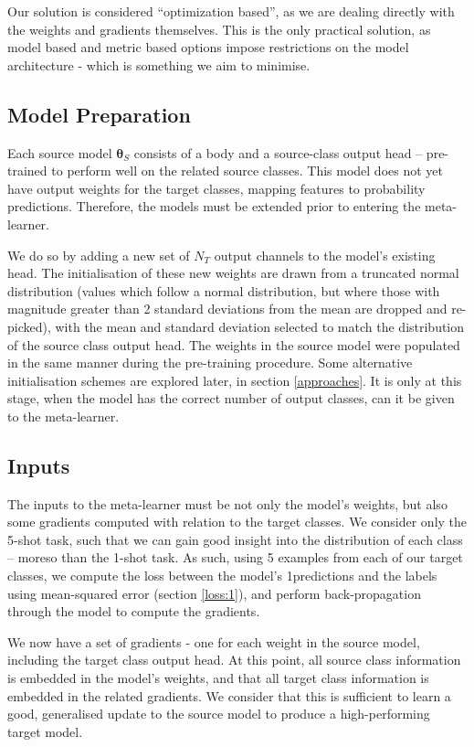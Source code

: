 \documentclass{report}
\begin{document}
Our solution is considered ``optimization based'', as we are dealing directly with the weights and gradients themselves. This is the only practical solution, as model based and metric based options impose restrictions on the model architecture - which is something we aim to minimise. \par




\subsection{Model Preparation}
Each source model $\bm{\theta}_S$ consists of a body and a source-class output head -- pre-trained to perform well on the related source classes. This model does not yet have output weights for the target classes, mapping features to probability predictions. Therefore, the models must be extended prior to entering the meta-learner. \par
We do so by adding a new set of $N_T$ output channels to the model's existing head. The initialisation of these new weights are drawn from a truncated normal distribution (values which follow a normal distribution, but where those with magnitude greater than 2 standard deviations from the mean are dropped and re-picked), with the mean and standard deviation selected to match the distribution of the source class output head. The weights in the source model were populated in the same manner during the pre-training procedure. Some alternative initialisation schemes are explored later, in section \ref{approaches}. It is only at this stage, when the model has the correct number of output classes, can it be given to the meta-learner. \par

\subsection{Inputs}
The inputs to the meta-learner must be not only the model's weights, but also some gradients computed with relation to the target classes. We consider only the 5-shot task, such that we can gain good insight into the distribution of each class -- moreso than the 1-shot task. As such, using 5 examples from each of our target classes, we compute the loss between the model's 1predictions and the labels using mean-squared error (section \ref{loss:1}), and perform back-propagation through the model to compute the gradients. \par
We now have a set of gradients - one for each weight in the source model, including the target class output head. At this point, all source class information is embedded in the model's weights, and that all target class information is embedded in the related gradients. We consider that this is sufficient to learn a good, generalised update to the source model to produce a high-performing target model.
\end{document}
